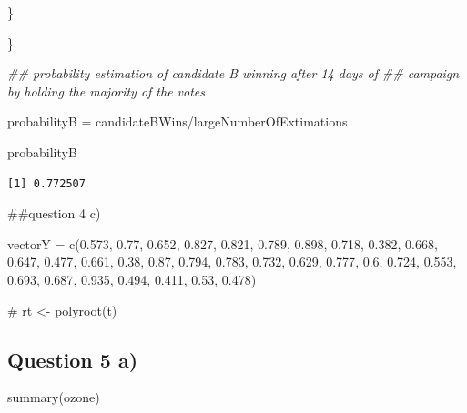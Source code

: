 \documentclass[
  a4paper,
  DIV=11,
  numbers=noendperiod]{scrartcl}
\newenvironment{Shaded}{\begin{snugshade}}{\end{snugshade}}
\newcommand{\CommentTok}[1]{\textcolor[rgb]{0.37,0.37,0.37}{#1}}
\newcommand{\DocumentationTok}[1]{\textcolor[rgb]{0.37,0.37,0.37}{\textit{#1}}}
\newcommand{\FloatTok}[1]{\textcolor[rgb]{0.68,0.00,0.00}{#1}}
\newcommand{\FunctionTok}[1]{\textcolor[rgb]{0.28,0.35,0.67}{#1}}
\newcommand{\NormalTok}[1]{\textcolor[rgb]{0.00,0.23,0.31}{#1}}
\newcommand{\OtherTok}[1]{\textcolor[rgb]{0.00,0.23,0.31}{#1}}
\newcommand{\SpecialCharTok}[1]{\textcolor[rgb]{0.37,0.37,0.37}{#1}}
\begin{document}
\begin{Shaded}
\begin{Highlighting}[]
\NormalTok{    \}}

\NormalTok{\}}

\DocumentationTok{\#\# probability estimation of candidate B winning after 14 days of}
\DocumentationTok{\#\# campaign by holding the majority of the votes}

\NormalTok{probabilityB }\OtherTok{=}\NormalTok{ candidateBWins}\SpecialCharTok{/}\NormalTok{largeNumberOfExtimations}

\NormalTok{probabilityB}
\end{Highlighting}
\end{Shaded}

\begin{verbatim}
[1] 0.772507
\end{verbatim}

\#\#question 4 c)

\begin{Shaded}
\begin{Highlighting}[]
\NormalTok{vectorY }\OtherTok{=} \FunctionTok{c}\NormalTok{(}\FloatTok{0.573}\NormalTok{, }\FloatTok{0.77}\NormalTok{, }\FloatTok{0.652}\NormalTok{, }\FloatTok{0.827}\NormalTok{, }\FloatTok{0.821}\NormalTok{, }\FloatTok{0.789}\NormalTok{, }\FloatTok{0.898}\NormalTok{, }\FloatTok{0.718}\NormalTok{, }\FloatTok{0.382}\NormalTok{,}
    \FloatTok{0.668}\NormalTok{, }\FloatTok{0.647}\NormalTok{, }\FloatTok{0.477}\NormalTok{, }\FloatTok{0.661}\NormalTok{, }\FloatTok{0.38}\NormalTok{, }\FloatTok{0.87}\NormalTok{, }\FloatTok{0.794}\NormalTok{, }\FloatTok{0.783}\NormalTok{, }\FloatTok{0.732}\NormalTok{, }\FloatTok{0.629}\NormalTok{, }\FloatTok{0.777}\NormalTok{,}
    \FloatTok{0.6}\NormalTok{, }\FloatTok{0.724}\NormalTok{, }\FloatTok{0.553}\NormalTok{, }\FloatTok{0.693}\NormalTok{, }\FloatTok{0.687}\NormalTok{, }\FloatTok{0.935}\NormalTok{, }\FloatTok{0.494}\NormalTok{, }\FloatTok{0.411}\NormalTok{, }\FloatTok{0.53}\NormalTok{, }\FloatTok{0.478}\NormalTok{)}

\CommentTok{\# rt \textless{}{-} polyroot(t)}
\end{Highlighting}
\end{Shaded}

\hypertarget{question-5-a}{%
\subsection{Question 5 a)}\label{question-5-a}}

\begin{Shaded}
\begin{Highlighting}[]
\FunctionTok{summary}\NormalTok{(ozone)}
\end{Highlighting}
\end{Shaded}
\end{document}
